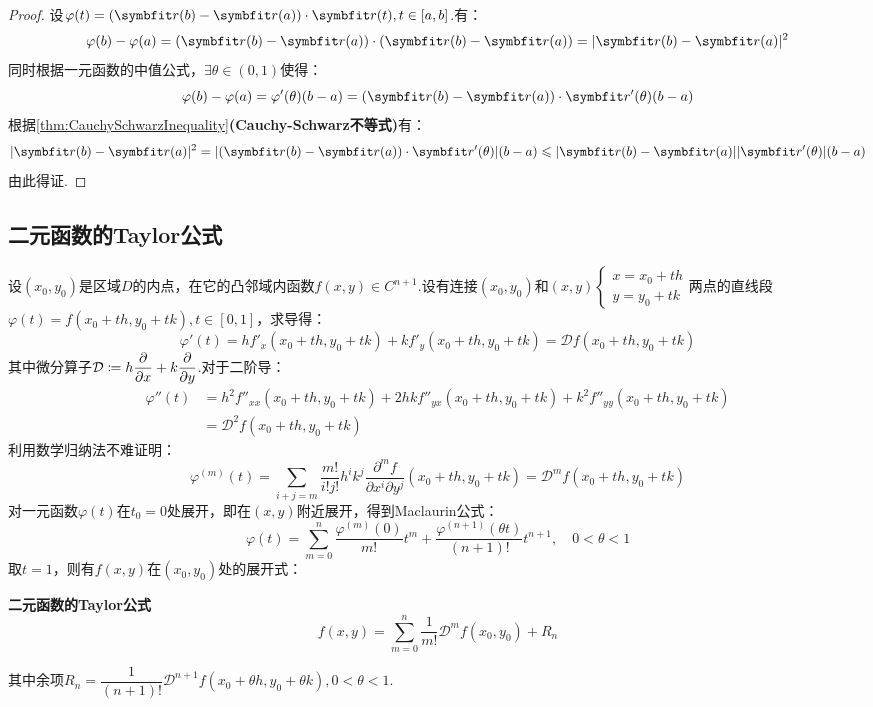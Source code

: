 \begin{proof}
    设$\varphi(t) = (\vb{r}(b) - \vb{r}(a))\cdot\vb{r}(t),t\in[a,b]$.有：
    \[\varphi(b) - \varphi(a) = (\vb{r}(b) - \vb{r}(a))\cdot(\vb{r}(b) - \vb{r}(a)) = |\vb{r}(b) - \vb{r}(a)|^2\]
    同时根据一元函数的中值公式，$\exists\theta\in(0,1)$使得：
    \[\varphi(b) - \varphi(a) = \varphi'(\theta)(b-a) = (\vb{r}(b)-\vb{r}(a))\cdot\vb{r}'(\theta)(b-a)\]
    根据\cref{thm:CauchySchwarzInequality}\textbf{(Cauchy-Schwarz不等式)}有：
    \[|\vb{r}(b)-\vb{r}(a)|^2 = |(\vb{r}(b) - \vb{r}(a))\cdot\vb{r}'(\theta)|(b-a) \leqslant |\vb{r}(b)-\vb{r}(a)||\vb{r}'(\theta)|(b-a)\]
    由此得证.
\end{proof}


\subsection{二元函数的Taylor公式}
设$(x_0,y_0)$是区域$D$的内点，在它的凸邻域内函数$f(x,y)\in C^{n+1}$.设有连接$(x_0,y_0)$和$(x,y)\begin{cases}
    x = x_0 + th \\
    y = y_0 + tk
\end{cases}$两点的直线段$\varphi(t) = f(x_0+th,y_0+tk),t\in[0,1]$，求导得：
\[\varphi'(t) = hf'_x(x_0+th,y_0+tk) + kf'_y(x_0+th,y_0+tk) = \mathcal{D}f(x_0+th,y_0+tk)\]
其中微分算子$\displaystyle\mathcal{D}\coloneq h\pdv{x} + k\pdv{y}$.对于二阶导：
\begin{align*}
    \varphi''(t) &= h^2f''_{xx}(x_0+th,y_0+tk) + 2hkf''_{yx}(x_0+th,y_0+tk)+k^2f''_{yy}(x_0+th,y_0+tk) \\
    &= \mathcal{D}^2f(x_0+th,y_0+tk)
\end{align*}
利用数学归纳法不难证明：
\[\varphi^{(m)}(t) = \sum_{i+j=m}\frac{m!}{i!j!}h^i k^j\frac{\partial^m f}{\partial x^i \partial y^j}(x_0+th,y_0+tk) = \mathcal{D}^m f(x_0+th,y_0+tk)\]
对一元函数$\varphi(t)$在$t_0 = 0$处展开，即在$(x,y)$附近展开，得到Maclaurin公式：
\[\varphi(t) = \sum_{m=0}^{n}\frac{\varphi^{(m)}(0)}{m!}t^m + \frac{\varphi^{(n+1)}(\theta t)}{(n+1)!}t^{n+1},\quad 0< \theta < 1\]
取$t = 1$，则有$f(x,y)$在$(x_0,y_0)$处的展开式：
\begin{theorem}
    \textbf{二元函数的Taylor公式}
    \[f(x,y) = \sum_{m=0}^{n}\frac{1}{m!}\mathcal{D}^m f(x_0,y_0) + R_n\]

    其中余项$R_n = \dfrac{1}{(n+1)!}\mathcal{D}^{n+1}f(x_0+\theta h,y_0+\theta k),0<\theta<1$.
\end{theorem}

